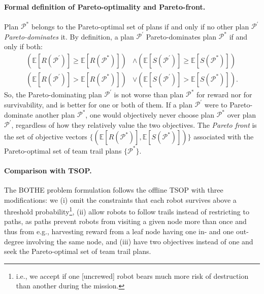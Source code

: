 \documentclass[fleqn,10pt,lineno]{wlpeerj}
\begin{document}
\paragraph{Formal definition of Pareto-optimality and Pareto-front.}
Plan $\mathcal{P}^*$ belongs to the Pareto-optimal set of plans if and only if no other plan $\mathcal{P}^\prime$ \emph{Pareto-dominates} it. By definition, a plan $\mathcal{P}^\prime$ Pareto-dominates plan $\mathcal{P}^*$ if and only if both:
\begin{align}
	\left (\mathbb{E}[R(\mathcal{P}^\prime)] \geq \mathbb{E}[R(\mathcal{P}^*)]  \right) & \wedge \left( \mathbb{E}[S(\mathcal{P}^\prime)] \geq \mathbb{E}[S(\mathcal{P}^*)] \right) \\
	\left( \mathbb{E}[R(\mathcal{P}^\prime)] > \mathbb{E}[R(\mathcal{P}^*)] \right) & \vee \left( \mathbb{E}[S(\mathcal{P}^\prime)] > \mathbb{E}[S(\mathcal{P}^*)] \right).
\end{align}
So, the Pareto-dominating plan $\mathcal{P}^\prime$ is not worse than plan $\mathcal{P}^*$ for reward nor for survivability, and is better for one or both of them.
If a plan $\mathcal{P}^\prime$ were to Pareto-dominate another plan $\mathcal{P}^*$, one would objectively never choose plan $\mathcal{P}^*$ over plan $\mathcal{P}^\prime$, regardless of how they relatively value the two objectives. The \emph{Pareto front} is the set of objective vectors $\{(\mathbb{E}[R(\mathcal{P}^*)], \mathbb{E}[S(\mathcal{P}^*)])\}$ associated with the Pareto-optimal set of team trail plans $\{\mathcal{P}^*\}$.  

\paragraph{Comparison with TSOP.}
The BOTHE problem formulation follows the offline TSOP \cite{jorgensen2018team} with three modifications: we 
(i) omit the constraints that each robot survives above a threshold probability\footnote{i.e., we accept if one [uncrewed] robot bears much more risk of destruction than another during the mission.},
(ii) allow robots to follow trails instead of restricting to paths, as paths prevent robots from visiting a given node more than once and thus from e.g., harvesting reward from a leaf node having one in- and one out-degree involving the same node, 
and
(iii) have two objectives instead of one and seek the Pareto-optimal set of team trail plans.
\end{document}

